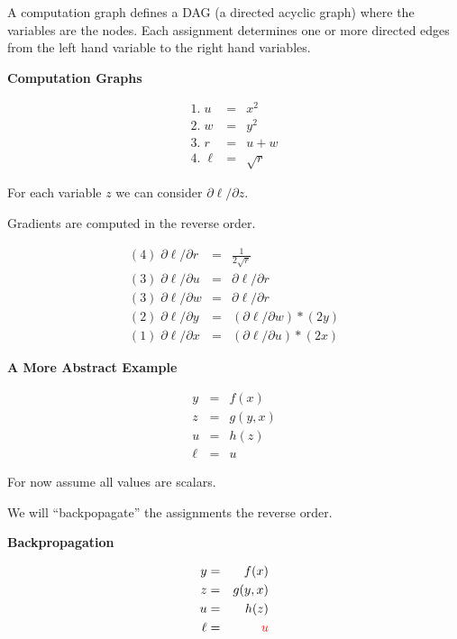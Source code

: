 \documentclass[landscape]{article}
\newcommand{\anaslide}[1]{
  \vfill
  \centerline{\Large\thepage}
  \eject \centerline{\bf #1}}
\begin{document}
{\vfill
A computation graph defines a DAG (a directed acyclic graph) where the variables are the nodes. Each assignment determines
one or more directed edges from the left hand variable to the right hand variables.

\anaslide{Computation Graphs}
\vspace{-1ex}
$$\begin{array}{lcl}
 1.\;u & = & x^2  \\
 2.\;w & = & y^2 \\
 3.\;r & =& u + w \\
  4.\;\ell & = & \sqrt{r}
\end{array}$$

\vfill
For each variable $z$ we can consider $\partial \ell/\partial z$.

\vfill
Gradients are computed in the reverse order.

\vfill
$$\begin{array}{lcl}
(4)\; \partial\ell/\partial r & = & \frac{1}{2\sqrt{r}} \\
(3)\; \partial\ell/\partial u & = & \partial \ell/\partial r \\
(3)\; \partial\ell/\partial w & = & \partial \ell/\partial r\\
(2)\; \partial\ell/\partial y & = & (\partial \ell/\partial w) * (2y) \\
(1)\; \partial\ell/\partial x & = & (\partial \ell/\partial u) * (2x)
\end{array}$$

\anaslide{A More Abstract Example}
\vspace{-3ex}
\begin{eqnarray*}
  y & = & f(x) \\
  z & = & g(y,x) \\
  u & = & h(z) \\
  \ell & = & u
\end{eqnarray*}

\medskip
For now assume all values are scalars.

\medskip
We will ``backpopagate'' the assignments the reverse order.

\anaslide{Backpropagation}
\vspace{-3ex}
\begin{eqnarray*}
  y & = & f(x) \\
  z & = & g(y,x) \\
  u & = & h(z) \\
  \ell &  = & {\color{red} u}
\end{eqnarray*}

}
\end{document}
